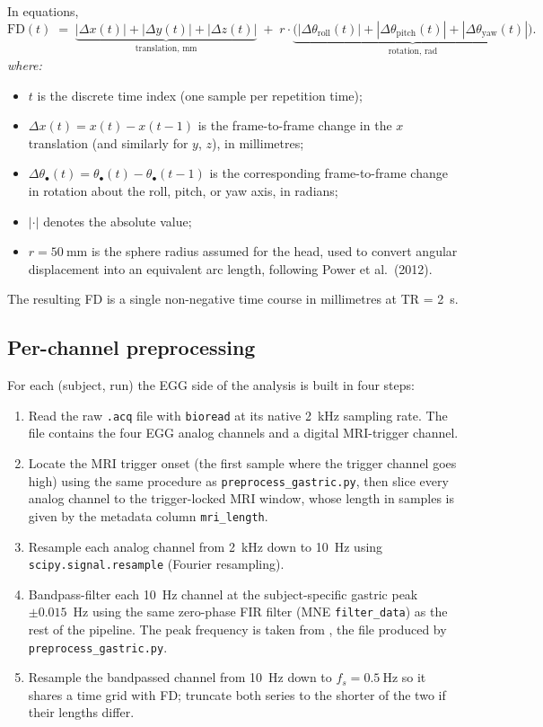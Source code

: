 \documentclass[11pt]{article}
\begin{document}
In equations,
\begin{equation}
\mathrm{FD}(t) \;=\;
\underbrace{|\Delta x(t)| + |\Delta y(t)| + |\Delta z(t)|}_{\text{translation, mm}}
\;+\; r\cdot
\underbrace{\bigl(|\Delta\theta_{\text{roll}}(t)| + |\Delta\theta_{\text{pitch}}(t)| + |\Delta\theta_{\text{yaw}}(t)|\bigr)}_{\text{rotation, rad}}.
\end{equation}
\textit{where:}
\begin{itemize}\setlength{\itemsep}{1pt}
\item $t$ is the discrete time index (one sample per repetition time);
\item $\Delta x(t) = x(t)-x(t-1)$ is the frame-to-frame change in the
$x$ translation (and similarly for $y$, $z$), in millimetres;
\item $\Delta\theta_{\bullet}(t) = \theta_{\bullet}(t) -
\theta_{\bullet}(t-1)$ is the corresponding frame-to-frame change in
rotation about the roll, pitch, or yaw axis, in radians;
\item $|\cdot|$ denotes the absolute value;
\item $r = \SI{50}{\milli\meter}$ is the sphere radius assumed for the
head, used to convert angular displacement into an equivalent arc
length, following Power et al.\ (2012).
\end{itemize}
The resulting FD is a single non-negative time course in millimetres
at TR = 2~s.

\subsection{Per-channel preprocessing}

For each (subject, run) the EGG side of the analysis is built in four
steps:

\begin{enumerate}
\item Read the raw \texttt{.acq} file with \texttt{bioread} at its
native 2~kHz sampling rate. The file contains the four EGG analog
channels and a digital MRI-trigger channel.
\item Locate the MRI trigger onset (the first sample where the trigger
channel goes high) using the same procedure as
\texttt{preprocess\_gastric.py}, then slice every analog channel to the
trigger-locked MRI window, whose length in samples is given by the
metadata column \texttt{mri\_length}.
\item Resample each analog channel from 2~kHz down to 10~Hz using
\texttt{scipy.signal.resample} (Fourier resampling).
\item Bandpass-filter each 10~Hz channel at the subject-specific
gastric peak $\pm 0.015$~Hz using the same zero-phase FIR filter
(MNE \texttt{filter\_data}) as the rest of the pipeline. The peak
frequency is taken from , the file produced by
\texttt{preprocess\_gastric.py}.
\item Resample the bandpassed channel from 10~Hz down to
$f_s = \SI{0.5}{\hertz}$ so it shares a time grid with FD; truncate
both series to the shorter of the two if their lengths differ.
\end{enumerate}
\end{document}
